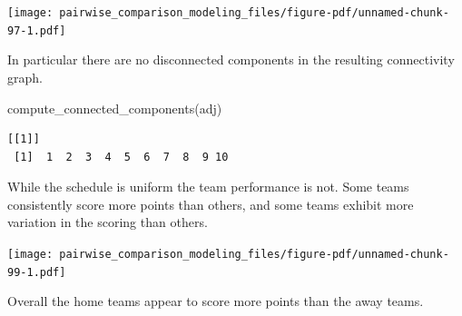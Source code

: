 \documentclass[
  letterpaper,
  DIV=11,
  numbers=noendperiod]{scrartcl}
\newenvironment{Shaded}{\begin{snugshade}}{\end{snugshade}}
\newcommand{\AttributeTok}[1]{\textcolor[rgb]{0.40,0.45,0.13}{#1}}
\newcommand{\ControlFlowTok}[1]{\textcolor[rgb]{0.00,0.23,0.31}{#1}}
\newcommand{\DecValTok}[1]{\textcolor[rgb]{0.68,0.00,0.00}{#1}}
\newcommand{\FunctionTok}[1]{\textcolor[rgb]{0.28,0.35,0.67}{#1}}
\newcommand{\NormalTok}[1]{\textcolor[rgb]{0.00,0.23,0.31}{#1}}
\newcommand{\OtherTok}[1]{\textcolor[rgb]{0.00,0.23,0.31}{#1}}
\newcommand{\SpecialCharTok}[1]{\textcolor[rgb]{0.37,0.37,0.37}{#1}}
\newcommand{\StringTok}[1]{\textcolor[rgb]{0.13,0.47,0.30}{#1}}
\begin{document}
\texttt{[image: pairwise\_comparison\_modeling\_files/figure-pdf/unnamed-chunk-97-1.pdf]}

In particular there are no disconnected components in the resulting
connectivity graph.

\begin{Shaded}
\begin{Highlighting}[]
\FunctionTok{compute\_connected\_components}\NormalTok{(adj)}
\end{Highlighting}
\end{Shaded}

\begin{verbatim}
[[1]]
 [1]  1  2  3  4  5  6  7  8  9 10
\end{verbatim}

While the schedule is uniform the team performance is not. Some teams
consistently score more points than others, and some teams exhibit more
variation in the scoring than others.

\begin{Shaded}
\end{Shaded}

\texttt{[image: pairwise\_comparison\_modeling\_files/figure-pdf/unnamed-chunk-99-1.pdf]}

Overall the home teams appear to score more points than the away teams.
\end{document}
